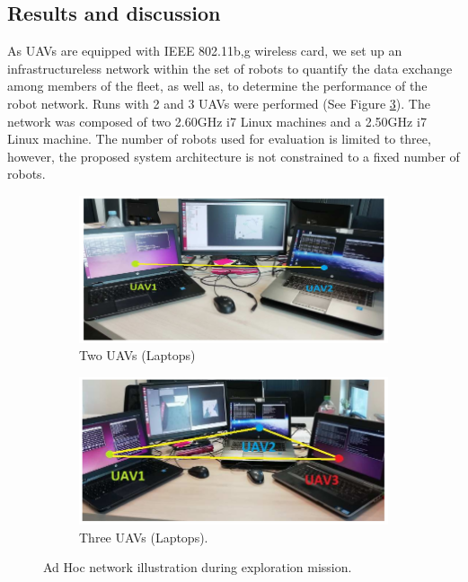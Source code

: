 \documentclass[11pt,openany]{book}
\begin{document}
\subsection{Results and discussion}
As UAVs are equipped with IEEE 802.11b,g wireless card, we set up an infrastructureless network within the set of robots to quantify the data exchange among members of the fleet, as well as, to determine the performance of the robot network. Runs with 2 and 3 UAVs were performed (See Figure \ref{fig:4.7}). The network was composed of two 2.60GHz i7 Linux machines and a 2.50GHz i7 Linux machine. The number of robots used for evaluation is limited to three, however, the proposed system architecture is not constrained to a ﬁxed number of robots.
\begin{figure}[H]
    \centering
    \begin{subfigure}[H]{0.7\linewidth}
        \includegraphics[width=\linewidth]{assets/4_7_a.png}
        \caption{{Two UAVs (Laptops)}}
        \label{fig:4.7a}
    \end{subfigure}
    \begin{subfigure}[H]{0.7\linewidth}
        \includegraphics[width=\linewidth]{assets/4_7_b.png}
        \caption{{Three UAVs (Laptops).}}
        \label{fig:4.7b}
    \end{subfigure}
    \caption{Ad Hoc network illustration during exploration mission.}
    \label{fig:4.7}
\end{figure}
\end{document}
